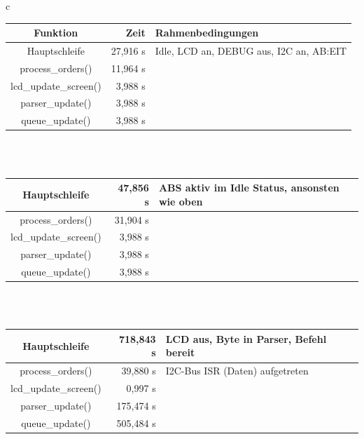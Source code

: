 \begin{table}[htb]
\begin{center}
	\begin{tabular}{c}
	\begin{tabularx}{\textwidth}{|c||r|X|}
		\hline
		\textbf{Funktion} & \textbf{Zeit} & \textbf{Rahmenbedingungen} \\ \hline \hline
		Hauptschleife & 27,916 \textmu{}s & Idle, LCD an, DEBUG aus, I2C an, AB:EIT \\ \hline
		process\_orders() & 11,964 \textmu{}s &  \\ \hline
		lcd\_update\_screen() & 3,988 \textmu{}s &  \\ \hline
		parser\_update() & 3,988 \textmu{}s &  \\ \hline
		queue\_update() & 3,988 \textmu{}s &  \\ \hline
	\end{tabularx} \\
	\\
	\begin{tabularx}{\textwidth}{|c||r|X|}
		\hline
		Hauptschleife & 47,856 \textmu{}s & ABS aktiv im Idle Status, ansonsten wie oben \\ \hline
		process\_orders() & 31,904 \textmu{}s &  \\ \hline
		lcd\_update\_screen() & 3,988 \textmu{}s &  \\ \hline
		parser\_update() & 3,988 \textmu{}s &  \\ \hline
		queue\_update() & 3,988 \textmu{}s &  \\ \hline
	\end{tabularx} \\
	\\
	\begin{tabularx}{\textwidth}{|c||r|X|}
		\hline
		Hauptschleife & 718,843 \textmu{}s & LCD aus, Byte in Parser, Befehl bereit \\ \hline
		process\_orders() & 39,880 \textmu{}s & I2C-Bus ISR (Daten) aufgetreten \\ \hline
		lcd\_update\_screen() & 0,997 \textmu{}s &  \\ \hline
		parser\_update() & 175,474 \textmu{}s &  \\ \hline
		queue\_update() & 505,484 \textmu{}s &  \\ \hline
	\end{tabularx} \\
	\\
	\begin{tabularx}{\textwidth}{|c||r|X|}

\end{tabularx}
\end{tabular}
\end{center}
\end{table}
